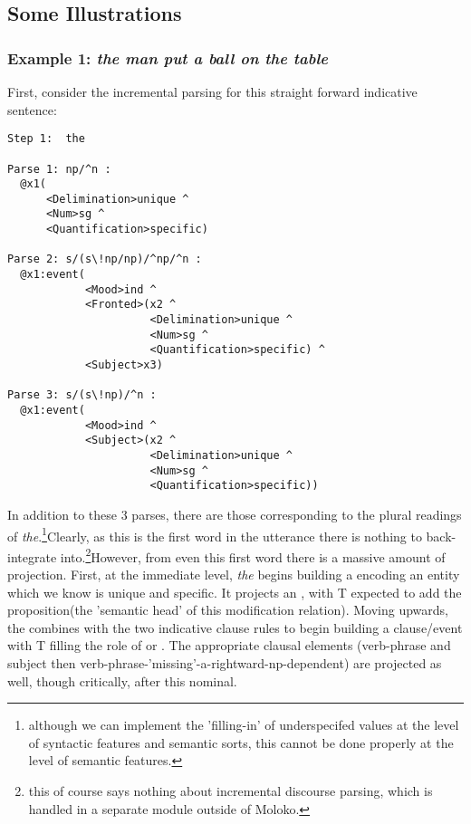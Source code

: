 \subsection{Some Illustrations}

\subsubsection{Example 1: \emph{the man put a ball on the table}}
First, consider the incremental parsing for this straight forward indicative sentence: \\  

\begin{verbatim}
Step 1:  the

Parse 1: np/^n : 
  @x1(
      <Delimination>unique ^ 
      <Num>sg ^ 
      <Quantification>specific)

Parse 2: s/(s\!np/np)/^np/^n : 
  @x1:event(
            <Mood>ind ^ 
            <Fronted>(x2 ^ 
                      <Delimination>unique ^ 
                      <Num>sg ^ 
                      <Quantification>specific) ^ 
            <Subject>x3)

Parse 3: s/(s\!np)/^n : 
  @x1:event(
            <Mood>ind ^ 
            <Subject>(x2 ^ 
                      <Delimination>unique ^ 
                      <Num>sg ^ 
                      <Quantification>specific))
\end{verbatim}
In addition to these 3 parses, there are those corresponding to the plural readings of \emph{the}.\footnote{ although we can implement the 'filling-in' of underspecifed values at the level of syntactic features and semantic sorts, this cannot be done properly at the level of semantic features.}Clearly, as this is the first word in the utterance there is nothing to back-integrate into.\footnote{this of course says nothing about incremental discourse parsing, which is handled in a separate module outside of Moloko.}However, from even this first word there is a massive amount of projection. First, at the immediate level, \emph{the}  begins building a   encoding an entity which we know is unique and specific. It projects an  , with T expected to add the proposition(the 'semantic head' of this modification relation).  Moving upwards, the  combines with the two indicative clause rules to begin building a clause/event with T filling the role of  or . The appropriate clausal elements (verb-phrase and subject then verb-phrase-'missing'-a-rightward-np-dependent) are projected as well, though critically, after this nominal.
